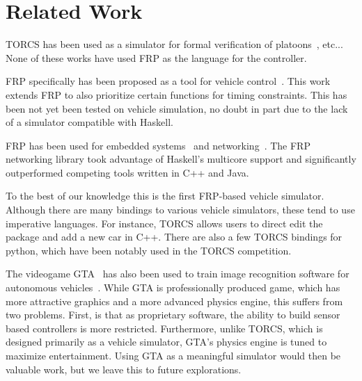 \section{Related Work}

TORCS has been used as a simulator for formal verification of platoons~\cite{kamali2016formal}, etc...
None of these works have used FRP as the language for the controller.


FRP specifically has been proposed as a tool for vehicle control~\cite{kazemi2016,zou2016}.
This work extends FRP to also prioritize certain functions for timing constraints.
This has been not yet been tested on vehicle simulation, no doubt in part due to the lack of a simulator compatible with Haskell.

FRP has been used for embedded systems~\cite{helbling2016juniper} and networking~\cite{voellmy2012scalable}.
The FRP networking library took advantage of Haskell's multicore support and significantly outperformed competing tools written in C++ and Java.


To the best of our knowledge this is the first FRP-based vehicle simulator.
Although there are many bindings to various vehicle simulators, these tend to use imperative languages.
For instance, TORCS allows users to direct edit the package and add a new car in C++.
There are also a few TORCS bindings for python, which have been notably used in the TORCS competition.

The videogame GTA~\cite{} has also been used to train image recognition software for autonomous vehicles~\cite{}.
While GTA is professionally produced game, which has more attractive graphics and a more advanced physics engine, this suffers from two problems.
First, is that as proprietary software, the ability to build sensor based controllers is more restricted. 
Furthermore, unlike TORCS, which is designed primarily as a vehicle simulator, GTA's physics engine is tuned to maximize entertainment.
Using GTA as a meaningful simulator would then be valuable work, but we leave this to future explorations.
